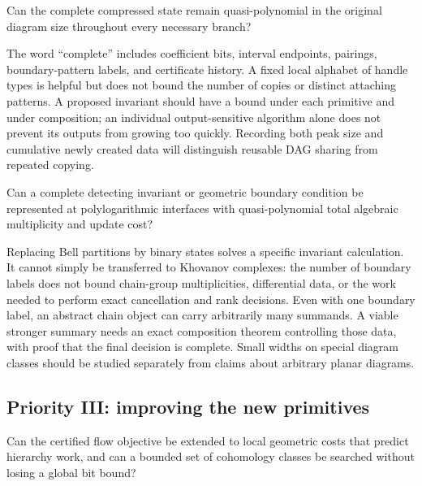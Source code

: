 \begin{question}
Can the complete compressed state remain quasi-polynomial in the original
diagram size throughout every necessary branch?
\end{question}

The word ``complete'' includes coefficient bits, interval endpoints,
pairings, boundary-pattern labels, and certificate history. A fixed local
alphabet of handle types is helpful but does not bound the number of copies
or distinct attaching patterns. A proposed invariant should have a bound
under each primitive and under composition; an individual output-sensitive
algorithm alone does not prevent its outputs from growing too quickly.
Recording both peak size and cumulative newly created data will distinguish
reusable DAG sharing from repeated copying.

\begin{question}
Can a complete detecting invariant or geometric boundary condition be
represented at polylogarithmic interfaces with quasi-polynomial total
algebraic multiplicity and update cost?
\end{question}

Replacing Bell partitions by binary states solves a specific invariant
calculation. It cannot simply be transferred to Khovanov complexes: the
number of boundary labels does not bound chain-group multiplicities,
differential data, or the work needed to perform exact cancellation and
rank decisions. Even with one boundary label, an abstract chain object can
carry arbitrarily many summands. A viable stronger summary needs an exact
composition theorem controlling those data, with proof that the final
decision is complete. Small widths on special diagram classes should be
studied separately from claims about arbitrary planar diagrams.

\subsection{Priority III: improving the new primitives}

\begin{question}
Can the certified flow objective be extended to local geometric costs that
predict hierarchy work, and can a bounded set of cohomology classes be
searched without losing a global bit bound?
\end{question}

